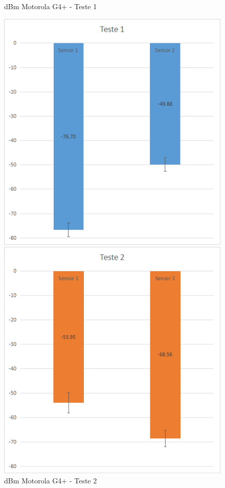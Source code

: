 \begin{figure}[htb]
	\label{mg4-distance}
	\centering
	\begin{minipage}{0.49\textwidth}
	\centering
		\caption{\label{fig-mg4-t1}dBm Motorola G4+ - Teste 1}
		\includegraphics[width=1\textwidth]{060-testes/data-analisis/distance-mg4plus-netflix/target-Teste1.png}
	\end{minipage}
	\hfill
	\begin{minipage}{0.49\textwidth}
	\centering
		\caption{\label{fig-mg4-t2}dBm Motorola G4+ - Teste 2}
		\includegraphics[width=1\textwidth]{060-testes/data-analisis/distance-mg4plus-netflix/target-Teste2.png}
	\end{minipage}
\end{figure}
